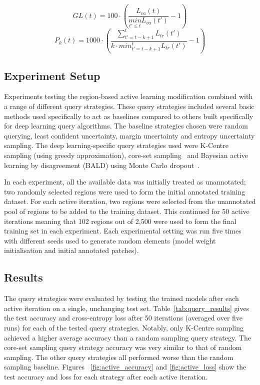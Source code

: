 \begin{equation}
	GL(t) = 100 \cdot \left ( \frac{L_{va}(t)}{\underset{t'\leq t}{min}L_{va}(t')} - 1 \right )
	\label{eq:generalization_loss}
\end{equation}
\begin{equation}
	P_k(t) = 1000 \cdot \left ( \frac{\sum_{t'=t-k+1}^{t}L_{tr}(t')}{k \cdot min^{t}_{t'=t-k+1}L_{tr}(t')} - 1\right )
	\label{eq:training_progression}
\end{equation}

\subsection{Experiment Setup}
Experiments testing the region-based active learning modification combined with a range of different query strategies. These query strategies included several basic methods used specifically to act as baselines compared to others built specifically for deep learning query algorithms. The baseline strategies chosen were random querying, least confident uncertainty, margin uncertainty and entropy uncertainty sampling. The deep learning-specific query strategies used were K-Centre sampling (using greedy approximation), core-set sampling~\citep{sener2017active} and Bayesian active learning by disagreement (BALD) using Monte Carlo dropout~\citep{gal2017deep}.

In each experiment, all the available data was initially treated as unannotated; two randomly selected regions were used to form the initial annotated training dataset. For each active iteration, two regions were selected from the unannotated pool of regions to be added to the training dataset. This continued for 50 active iterations meaning that 102 regions out of 2,500 were used to form the final training set in each experiment. Each experimental setting was run five times with different seeds used to generate random elements (model weight initialisation and initial annotated patches).

\subsection{Results}
The query strategies were evaluated by testing the trained models after each active iteration on a single, unchanging test set. Table~\ref{tab:query_results} gives the test accuracy and cross-entropy loss after 50 iterations (averaged over five runs) for each of the tested query strategies. Notably, only K-Centre sampling achieved a higher average accuracy than a random sampling query strategy. The core-set sampling query strategy accuracy was very similar to that of random sampling. The other query strategies all performed worse than the random sampling baseline. Figures ~\ref{fig:active_accuracy} and \ref{fig:active_loss} show the test accuracy and loss for each strategy after each active iteration.

